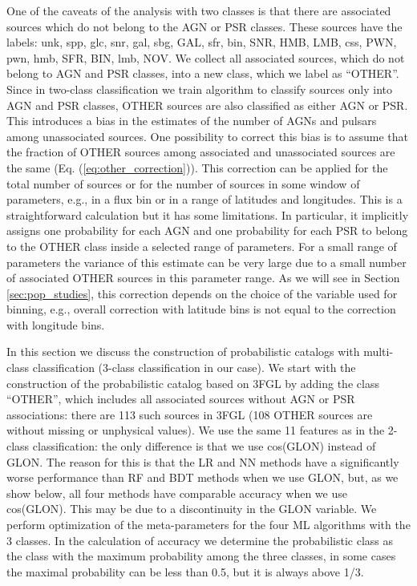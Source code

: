 \documentclass{aa}
\begin{document}
One of the caveats of the analysis with two classes is that there are associated sources which do not belong to the AGN or PSR classes. 
These sources have the labels: unk, spp, glc, snr, gal, sbg, GAL, sfr, bin, SNR, HMB, LMB, css, PWN, pwn, hmb, SFR, BIN, lmb, NOV.
We collect all associated sources, which do not belong to AGN and PSR classes, into a new class, which we label as ``OTHER''.
Since in two-class classification we train algorithm to classify sources only into AGN and PSR classes, OTHER sources are also classified as either AGN or PSR.
This introduces a bias in the estimates of the number of AGNs and pulsars among unassociated sources.
One possibility to correct this bias is to assume that the fraction of OTHER sources among associated and unassociated sources are the same (Eq. (\ref{eq:other_correction})).
This correction can be applied for the total number of sources or for the number of sources in some window of parameters,
e.g., in a flux bin or in a range of latitudes and longitudes.
This is a straightforward calculation but it has some limitations. 
In particular, it implicitly assigns one probability for each AGN and one probability for each PSR to belong to the OTHER class inside a selected range of parameters.
For a small range of parameters the variance of this estimate can be very large due to a small number of associated OTHER sources in this parameter range.
As we will see in Section \ref{sec:pop_studies}, this correction depends on the choice of the variable used for binning, e.g.,
overall correction with latitude bins is not equal to the correction with longitude bins.

In this section we discuss the construction of probabilistic catalogs with multi-class classification (3-class classification in our case).
We start with the construction of the probabilistic catalog based on 3FGL by adding the class ``OTHER'', which includes all associated sources without AGN or PSR associations: there are 113 such sources in 3FGL (108 OTHER sources are without missing or unphysical values).
We use the same 11 features as in the 2-class classification: the only difference is that we use cos(GLON) instead of GLON.
The reason for this is that the LR and NN methods have a significantly worse performance than RF and BDT methods when we use GLON,
but, as we show below, all four methods have comparable accuracy when we use cos(GLON).
This may be due to a discontinuity in the GLON variable. 
We perform optimization of the meta-parameters for the four ML algorithms with the 3 classes.
In the calculation of accuracy we determine the probabilistic class as the class with the maximum probability among the three classes,
in some cases the maximal probability can be less than 0.5, but it is always above 1/3.
\end{document}
